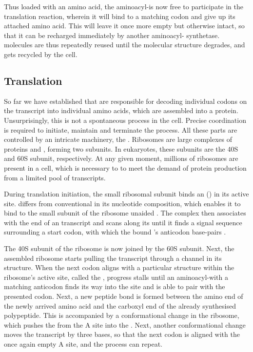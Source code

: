 Thus loaded with an amino acid, the aminoacyl-\trna is now free to participate
in the translation reaction, wherein it will bind to a matching codon and give
up its attached amino acid. This will leave it once more empty but otherwise
intact, so that it can be recharged immediately by another aminoacyl-\trna
synthetase. \trna molecules are thus repeatedly reused until the molecular
structure degrades, and gets recycled by the cell.

\subsection{Translation}

So far we have established that \trna[s] are responsible for decoding individual
codons on the \mrna transcript into individual amino acids, which are assembled
into a protein. Unsurprisingly, this is not a spontaneous process in the cell.
Precise coordination is required to initiate, maintain and terminate the
process. All these parts are controlled by an intricate machinery, the
. Ribosomes are large complexes of proteins and \rrna, forming
two subunits. In eukaryotes, these subunits are the 40S and 60S subunit,
respectively. At any given moment, millions of ribosomes are present in a cell,
which is necessary to to meet the demand of protein production from a limited
pool of \mrna transcripts.

During translation initiation, the small ribosomal subunit binds an
 () in its active site.
 differs from conventional  in its nucleotide
composition, which enables it to bind to the small subunit of the ribosome
unaided \citep{Kolitz:2010}. The complex then associates with the \fivep end of
an \mrna transcript and scans along its \fivep \utr until it finds a signal
sequence surrounding a start codon, with which the bound ’s anticodon
base-pairs \citep{Kozak:2002}.

The 40S subunit of the ribosome is now joined by the 60S subunit. Next, the
assembled ribosome starts pulling the \mrna transcript through a channel in its
structure. When the next codon aligns with a particular structure within the
ribosome’s active site, called the , progress stalls until an
aminoacyl-\trna with a matching anticodon finds its way into the site and is
able to pair with the presented codon. Next, a new peptide bond is formed
between the amino end of the newly arrived amino acid and the carboxyl end of
the already synthesised polypeptide. This is accompanied by a conformational
change in the ribosome, which pushes the \trna from the A site into the
. Next, another conformational change moves the \mrna transcript
by three bases, so that the next codon is aligned with the once again empty A
site, and the process can repeat.

